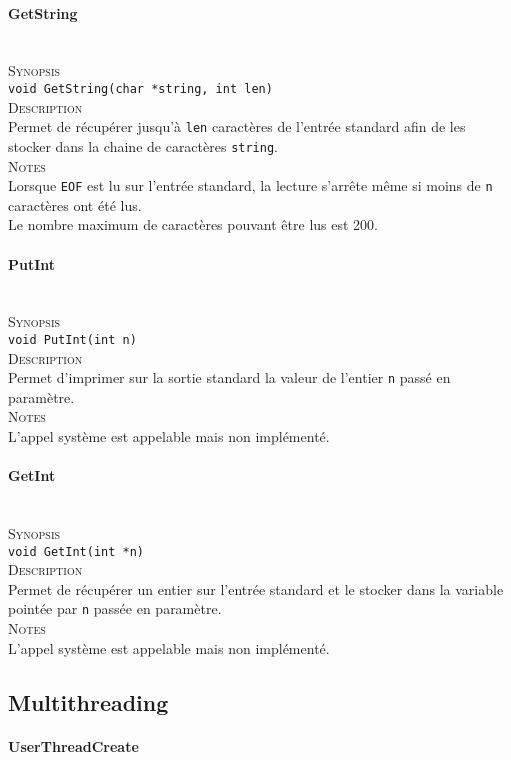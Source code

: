 \documentclass{report}
\newcommand{\myparagraph}[1]{\paragraph*{#1}\mbox{}\\}
\begin{document}
\myparagraph{GetString}

\textsc{Synopsis}\\
	\texttt{void GetString(char *string, int len)}\\
	
\textsc{Description}\\
	Permet de récupérer jusqu'à \texttt{len} caractères de l'entrée standard afin de les stocker dans la chaine de caractères \texttt{string}.\\
	
\textsc{Notes}\\
	Lorsque \texttt{EOF} est lu sur l'entrée standard, la lecture s'arrête même si moins de \texttt{n} caractères ont été lus.\\
	Le nombre maximum de caractères pouvant être lus est 200.\\
	
	
	
	
\myparagraph{PutInt}

\textsc{Synopsis}\\
	\texttt{void PutInt(int n)}\\
	
\textsc{Description}\\
	Permet d'imprimer sur la sortie standard la valeur de l'entier \texttt{n} passé en paramètre.\\
	
\textsc{Notes}\\
	L'appel système est appelable mais non implémenté.
	
	



\myparagraph{GetInt}

\textsc{Synopsis}\\
	\texttt{void GetInt(int *n)}\\
	
\textsc{Description}\\
	Permet de récupérer un entier sur l'entrée standard et le stocker dans la variable pointée par \texttt{n} passée en paramètre.\\
	
\textsc{Notes}\\
	L'appel système est appelable mais non implémenté.
	
	

\subsection*{Multithreading}
\myparagraph{UserThreadCreate}
\end{document}
